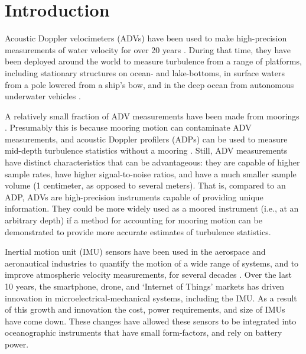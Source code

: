 
\section{Introduction}

Acoustic Doppler velocimeters (ADVs) have been used to make high-precision measurements of water velocity for over 20 years \cite[]{Kraus++1994, Lohrmann++1995}.  During that time, they have been deployed around the world to measure turbulence from a range of platforms, including stationary structures on ocean- and lake-bottoms, in surface waters from a pole lowered from a ship's bow, and in the deep ocean from autonomous underwater vehicles \cite[e.g.,][]{Voulgaris+Trowbridge1998, Zhang++2001, Kim++2000, Goodman++2006, Lorke2007, Geyer++2008, Cartwright++2009}. 


A relatively small fraction of ADV measurements have been made from moorings \cite[e.g.,][]{Fer+Paskyabi2014}. Presumably this is because mooring motion can contaminate ADV measurements, and acoustic Doppler profilers (ADPs) can be used to measure mid-depth turbulence statistics without a mooring \cite[e.g.,][]{Stacey++1999a, Rippeth++2002, Wiles++2006}. Still, ADV measurements have distinct characteristics that can be advantageous: they are capable of higher sample rates, have higher signal-to-noise ratios, and have a much smaller sample volume (1 centimeter, as opposed to several meters). That is, compared to an ADP, ADVs are high-precision instruments capable of providing unique information. They could be more widely used as a moored instrument (i.e., at an arbitrary depth) if a method for accounting for mooring motion can be demonstrated to provide more accurate estimates of turbulence statistics.

Inertial motion unit (IMU) sensors have been used in the aerospace and aeronautical industries to quantify the motion of a wide range of systems, and to improve atmospheric velocity measurements, for several decades \cite[]{Axford1968, Edson++1998, Bevly2004}. Over the last 10 years, the smartphone, drone, and `Internet of Things' markets has driven innovation in microelectrical-mechanical systems, including the IMU. As a result of this growth and innovation the cost, power requirements, and size of IMUs have come down. These changes have allowed these sensors to be integrated into oceanographic instruments that have small form-factors, and rely on battery power.

